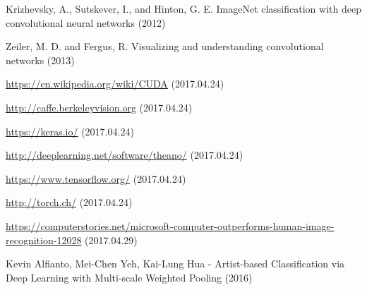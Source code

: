 \documentclass[12pt, a4paper, oneside]{book}
\theoremstyle{tetel}
\begin{document}
\newpage
\begin{thebibliography}{1}

Krizhevsky, A., Sutskever, I., and Hinton, G. E. ImageNet classification with deep convolutional neural networks (2012)

Zeiler, M. D. and Fergus, R. Visualizing and understanding convolutional networks (2013)

\url {https://en.wikipedia.org/wiki/CUDA} (2017.04.24)

\url {http://caffe.berkeleyvision.org} (2017.04.24)

\url {https://keras.io/} (2017.04.24)

\url {http://deeplearning.net/software/theano/} (2017.04.24)

\url {https://www.tensorflow.org/} (2017.04.24)

\url {http://torch.ch/} (2017.04.24)

\url {https://computerstories.net/microsoft-computer-outperforms-human-image-recognition-12028} (2017.04.29)

Kevin Alfianto, Mei-Chen Yeh, Kai-Lung Hua - Artist-based Classification via Deep Learning with Multi-scale Weighted Pooling (2016)




\end{thebibliography}
\end{document}
